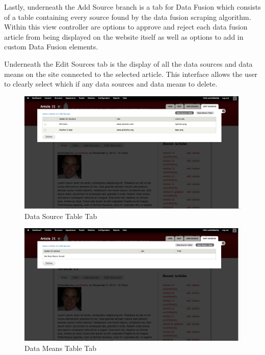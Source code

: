\documentclass[12pt]{article} %
\begin{document}
Lastly, underneath the Add Source branch is a tab for Data Fusion which consists of a table containing every source found by the data fusion scraping algorithm. Within this view controller  are options to approve and reject each data fusion article from being displayed on the website itself as well as options to add in custom Data Fusion elements.

Underneath the Edit Sources tab is the display of all the data sources and data means on the site connected to the selected article. This interface allows the user to clearly select which if any data sources and data means to delete.

\begin{figure}[htbp]
\begin{center}
\includegraphics[width=6in]{images/dataSourceTableTab}
\caption{Data Source Table Tab}
\end{center}
\end{figure}

\begin{figure}[htbp]
\begin{center}
\includegraphics[width=6in]{images/dataMeansTableTab}
\caption{Data Means Table Tab}
\end{center}
\end{figure}
\end{document}

